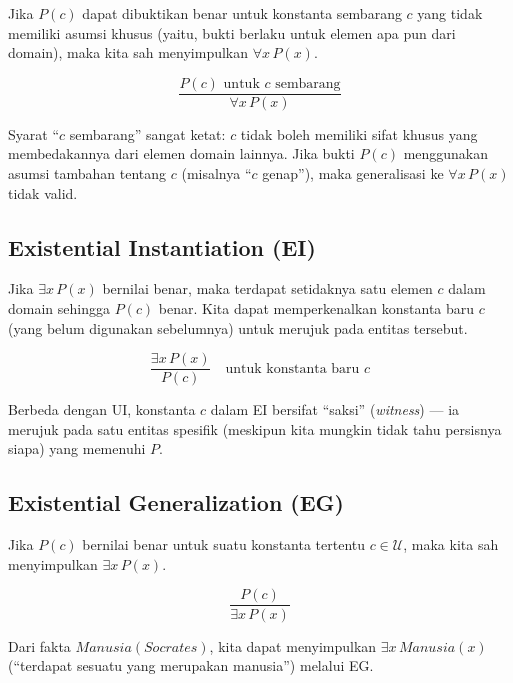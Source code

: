 \begin{definisi}
Jika $P(c)$ dapat dibuktikan benar untuk konstanta sembarang $c$ yang tidak memiliki asumsi khusus (yaitu, bukti berlaku untuk elemen apa pun dari domain), maka kita sah menyimpulkan $\forall x\, P(x)$.

\[ \frac{P(c) \text{ untuk } c \text{ sembarang}}{\forall x\, P(x)} \]
\end{definisi}

\begin{catatan}
Syarat ``$c$ sembarang'' sangat ketat: $c$ tidak boleh memiliki sifat khusus yang membedakannya dari elemen domain lainnya. Jika bukti $P(c)$ menggunakan asumsi tambahan tentang $c$ (misalnya ``$c$ genap''), maka generalisasi ke $\forall x\, P(x)$ tidak valid.
\end{catatan}

\subsection{Existential Instantiation (EI)}

\begin{definisi}
Jika $\exists x\, P(x)$ bernilai benar, maka terdapat setidaknya satu elemen $c$ dalam domain sehingga $P(c)$ benar. Kita dapat memperkenalkan konstanta baru $c$ (yang belum digunakan sebelumnya) untuk merujuk pada entitas tersebut.

\[ \frac{\exists x\, P(x)}{P(c)} \quad \text{untuk konstanta baru } c \]
\end{definisi}

Berbeda dengan UI, konstanta $c$ dalam EI bersifat ``saksi'' (\textit{witness}) --- ia merujuk pada satu entitas spesifik (meskipun kita mungkin tidak tahu persisnya siapa) yang memenuhi $P$.

\subsection{Existential Generalization (EG)}

\begin{definisi}
Jika $P(c)$ bernilai benar untuk suatu konstanta tertentu $c \in \mathcal{U}$, maka kita sah menyimpulkan $\exists x\, P(x)$.

\[ \frac{P(c)}{\exists x\, P(x)} \]
\end{definisi}

\begin{contoh}
Dari fakta $Manusia(Socrates)$, kita dapat menyimpulkan $\exists x\, Manusia(x)$ (``terdapat sesuatu yang merupakan manusia'') melalui EG.
\end{contoh}

